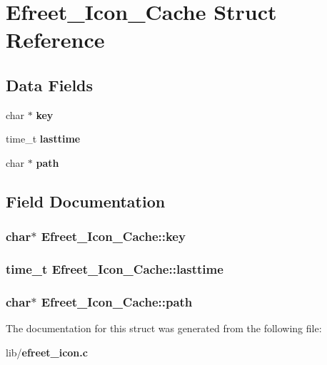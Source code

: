 \section{Efreet\_\-Icon\_\-Cache Struct Reference}
\label{structEfreet__Icon__Cache}
\subsection*{Data Fields}
\begin{CompactItemize}
\item 
char $\ast$ {\bf key}
\item 
time\_\-t {\bf lasttime}
\item 
char $\ast$ {\bf path}
\end{CompactItemize}


\subsection{Field Documentation}
\subsubsection{\setlength{\rightskip}{0pt plus 5cm}char$\ast$ {\bf Efreet\_\-Icon\_\-Cache::key}}\label{structEfreet__Icon__Cache_3af3581234cc81c8df0814ba97da8b07}


\subsubsection{\setlength{\rightskip}{0pt plus 5cm}time\_\-t {\bf Efreet\_\-Icon\_\-Cache::lasttime}}\label{structEfreet__Icon__Cache_021f8e16b27a63bbce0f9167305832f7}


\subsubsection{\setlength{\rightskip}{0pt plus 5cm}char$\ast$ {\bf Efreet\_\-Icon\_\-Cache::path}}\label{structEfreet__Icon__Cache_347ba910de6ba9a95cda8d1b1d7bb583}




The documentation for this struct was generated from the following file:\begin{CompactItemize}
\item 
lib/{\bf efreet\_\-icon.c}\end{CompactItemize}
